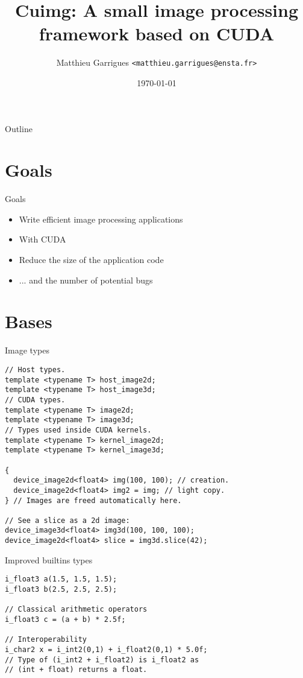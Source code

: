 \documentclass{beamer}
\title{Cuimg: A small image processing framework based on CUDA}
\author[Matthieu Garrigues]{Matthieu Garrigues  \texttt{<matthieu.garrigues@ensta.fr>}}
\date{\today}
\begin{document}
\begin{frame}
\maketitle
\end{frame}


\begin{frame}{Outline}
  \tableofcontents
\end{frame}

\section{Goals}

\begin{frame}{Goals}
  \begin{itemize}
  \item Write efficient image processing applications
  \item With CUDA
  \item Reduce the size of the application code
  \item ... and the number of potential bugs
  \end{itemize}
\end{frame}

\section{Bases}

\begin{frame}[containsverbatim]{Image types}
\begin{lstlisting}
// Host types.
template <typename T> host_image2d;
template <typename T> host_image3d;
// CUDA types.
template <typename T> image2d;
template <typename T> image3d;
// Types used inside CUDA kernels.
template <typename T> kernel_image2d;
template <typename T> kernel_image3d;

{
  device_image2d<float4> img(100, 100); // creation.
  device_image2d<float4> img2 = img; // light copy.
} // Images are freed automatically here.

// See a slice as a 2d image:
device_image3d<float4> img3d(100, 100, 100);
device_image2d<float4> slice = img3d.slice(42);
\end{lstlisting}
\end{frame}

\begin{frame}[containsverbatim]{Improved builtins types}
\begin{lstlisting}
i_float3 a(1.5, 1.5, 1.5);
i_float3 b(2.5, 2.5, 2.5);

// Classical arithmetic operators
i_float3 c = (a + b) * 2.5f;

// Interoperability
i_char2 x = i_int2(0,1) + i_float2(0,1) * 5.0f;
// Type of (i_int2 + i_float2) is i_float2 as
// (int + float) returns a float.
\end{lstlisting}
\end{frame}
\end{document}
